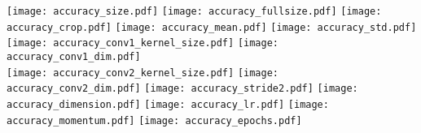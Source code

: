 \documentclass[a0,portrait]{a0poster}
\begin{document}
\begin{center}
\begin{minipage}{.9334\linewidth}
\texttt{[image: accuracy\_size.pdf]} 
\texttt{[image: accuracy\_fullsize.pdf]} 
\texttt{[image: accuracy\_crop.pdf]} 
\texttt{[image: accuracy\_mean.pdf]} 
\texttt{[image: accuracy\_std.pdf]} 
\texttt{[image: accuracy\_conv1\_kernel\_size.pdf]} 
\texttt{[image: accuracy\_conv1\_dim.pdf]} \\
\texttt{[image: accuracy\_conv2\_kernel\_size.pdf]} 
\texttt{[image: accuracy\_conv2\_dim.pdf]} 
\texttt{[image: accuracy\_stride2.pdf]} 
\texttt{[image: accuracy\_dimension.pdf]} 
\texttt{[image: accuracy\_lr.pdf]} 
\texttt{[image: accuracy\_momentum.pdf]} 
\texttt{[image: accuracy\_epochs.pdf]}
\end{minipage}
\end{center}

\vspace{2cm} 
\end{document}
